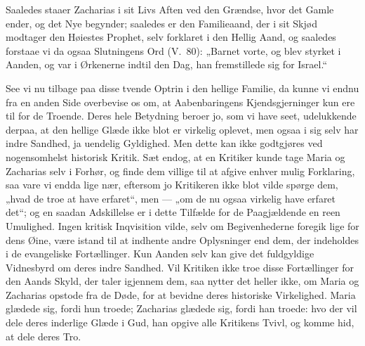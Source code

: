\documentclass[12pt,a4paper]{book}
\begin{document}
Saaledes staaer Zacharias i sit Livs Aften ved den Grændse, hvor det Gamle ender,
og det Nye begynder; saaledes er den Familieaand, der i sit Skjød modtager den
Høiestes Prophet, selv forklaret i den Hellig Aand, og saaledes forstaae vi da
ogsaa Slutningens Ord (V.\ 80): „Barnet vorte, og blev styrket i Aanden, og var i
Ørkenerne indtil den Dag, han fremstillede sig for Israel.“

See vi nu tilbage paa disse tvende Optrin i den hellige Familie, da kunne vi
endnu fra en anden Side overbevise os om, at Aabenbaringens Kjendsgjerninger kun
ere til for de Troende. Deres hele Betydning beroer jo, som vi have seet,
udelukkende derpaa, at den hellige Glæde ikke blot er virkelig oplevet, men ogsaa
i sig selv har indre Sandhed, ja uendelig Gyldighed. Men dette kan ikke
godtgjøres ved nogensomhelst historisk Kritik. Sæt endog, at en Kritiker kunde
tage Maria og Zacharias selv i Forhør, og finde dem villige til at afgive enhver
mulig Forklaring, saa vare vi endda lige nær, eftersom jo Kritikeren ikke blot
vilde spørge dem, „hvad de troe at have erfaret“, men --- „om de nu ogsaa
virkelig have erfaret det“; og en saadan Adskillelse er i dette Tilfælde for de
Paagjældende en reen Umulighed. Ingen kritisk Inqvisition vilde, selv om
Begivenhederne foregik lige for dens Øine, være istand til at indhente andre
Oplysninger end dem, der indeholdes i de evangeliske Fortællinger. Kun Aanden
selv kan give det fuldgyldige Vidnesbyrd om deres indre Sandhed. Vil Kritiken
ikke troe disse Fortællinger for den Aands Skyld, der taler igjennem dem, saa
nytter det heller ikke, om Maria og Zacharias opstode fra de Døde, for at bevidne
deres historiske Virkelighed. Maria glædede sig, fordi hun troede; Zacharias
glædede sig, fordi han troede: hvo
der vil dele deres inderlige Glæde i Gud, han opgive alle Kritikens Tvivl, og
komme hid, at dele deres Tro.
\end{document}
